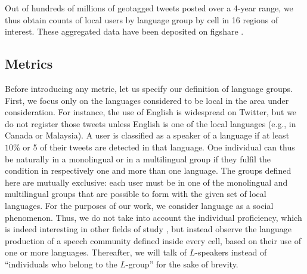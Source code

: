 \documentclass[../thesis.tex]{subfiles}
\begin{document}
Out of hundreds of millions of geotagged tweets posted over a 4-year range, we thus
obtain counts of local users by language group by cell in 16 regions of interest. These
aggregated data have been deposited on figshare \cite{LoufSpatialDistributions2021}.



\subsection{Metrics}
Before introducing any metric, let us specify our definition of language groups. First,
we focus only on the languages considered to be local in the area under consideration.
For instance, the use of English is widespread on Twitter, but we do not register those
tweets unless English is one of the local languages (e.g., in Canada or Malaysia). A
user is classified as a speaker of a language if at least $10\%$ or 5 of their tweets
are detected in that language. One individual can thus be naturally in a monolingual or
in a multilingual group if they fulfil the condition in respectively one and more than
one language. The groups defined here are mutually exclusive: each user must be in one
of the monolingual and multilingual groups that are possible to form with the given set
of local languages. For the purposes of our work, we consider language as a social
phenomenon. Thus, we do not take into account the individual proficiency, which is
indeed interesting in other fields of study \cite{BakerFoundationsBilingual1997}, but
instead observe the language production of a speech community defined inside every cell,
based on their use of one or more languages. Thereafter, we will talk of $L$-speakers
instead of ``individuals who belong to the $L$-group'' for the sake of brevity.
\end{document}
